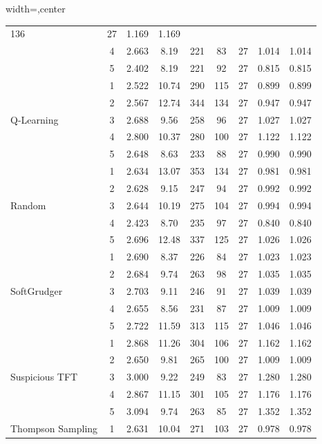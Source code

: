 \begin{table}[htbp]
\begin{adjustbox}{width=\textwidth,center}
\begin{tabular}{|l|c|c|c|c|c|c|c|c|}
136 & 
27 & 
1.169 & 
1.169 \\
 & 
4 & 
2.663 & 
8.19 & 
221 & 
83 & 
27 & 
1.014 & 
1.014 \\
 & 
5 & 
2.402 & 
8.19 & 
221 & 
92 & 
27 & 
0.815 & 
0.815 \\
\hline
\multirow{5}{*}{Q-Learning} & 
1 & 
2.522 & 
10.74 & 
290 & 
115 & 
27 & 
0.899 & 
0.899 \\
 & 
2 & 
2.567 & 
12.74 & 
344 & 
134 & 
27 & 
0.947 & 
0.947 \\
 & 
3 & 
2.688 & 
9.56 & 
258 & 
96 & 
27 & 
1.027 & 
1.027 \\
 & 
4 & 
2.800 & 
10.37 & 
280 & 
100 & 
27 & 
1.122 & 
1.122 \\
 & 
5 & 
2.648 & 
8.63 & 
233 & 
88 & 
27 & 
0.990 & 
0.990 \\
\hline
\multirow{5}{*}{Random} & 
1 & 
2.634 & 
13.07 & 
353 & 
134 & 
27 & 
0.981 & 
0.981 \\
 & 
2 & 
2.628 & 
9.15 & 
247 & 
94 & 
27 & 
0.992 & 
0.992 \\
 & 
3 & 
2.644 & 
10.19 & 
275 & 
104 & 
27 & 
0.994 & 
0.994 \\
 & 
4 & 
2.423 & 
8.70 & 
235 & 
97 & 
27 & 
0.840 & 
0.840 \\
 & 
5 & 
2.696 & 
12.48 & 
337 & 
125 & 
27 & 
1.026 & 
1.026 \\
\hline
\multirow{5}{*}{SoftGrudger} & 
1 & 
2.690 & 
8.37 & 
226 & 
84 & 
27 & 
1.023 & 
1.023 \\
 & 
2 & 
2.684 & 
9.74 & 
263 & 
98 & 
27 & 
1.035 & 
1.035 \\
 & 
3 & 
2.703 & 
9.11 & 
246 & 
91 & 
27 & 
1.039 & 
1.039 \\
 & 
4 & 
2.655 & 
8.56 & 
231 & 
87 & 
27 & 
1.009 & 
1.009 \\
 & 
5 & 
2.722 & 
11.59 & 
313 & 
115 & 
27 & 
1.046 & 
1.046 \\
\hline
\multirow{5}{*}{Suspicious TFT} & 
1 & 
2.868 & 
11.26 & 
304 & 
106 & 
27 & 
1.162 & 
1.162 \\
 & 
2 & 
2.650 & 
9.81 & 
265 & 
100 & 
27 & 
1.009 & 
1.009 \\
 & 
3 & 
3.000 & 
9.22 & 
249 & 
83 & 
27 & 
1.280 & 
1.280 \\
 & 
4 & 
2.867 & 
11.15 & 
301 & 
105 & 
27 & 
1.176 & 
1.176 \\
 & 
5 & 
3.094 & 
9.74 & 
263 & 
85 & 
27 & 
1.352 & 
1.352 \\
\hline
\multirow{5}{*}{Thompson Sampling} & 
1 & 
2.631 & 
10.04 & 
271 & 
103 & 
27 & 
0.978 & 
0.978 \\

\end{tabular}
\end{adjustbox}
\end{table}
